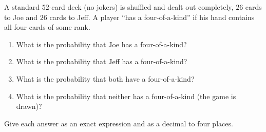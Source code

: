 A standard $52$-card deck (no jokers) is shuffled and dealt out completely, $26$ cards to Joe and $26$ cards to Jeff. A player ``has a four-of-a-kind'' if his hand contains all four cards of some rank.
\begin{enumerate}
\item[(a)] What is the probability that Joe has a four-of-a-kind?
\item[(b)] What is the probability that Jeff has a four-of-a-kind?
\item[(c)] What is the probability that both have a four-of-a-kind?
\item[(d)] What is the probability that neither has a four-of-a-kind (the game is drawn)?
\end{enumerate}
Give each answer as an exact expression and as a decimal to four places.
